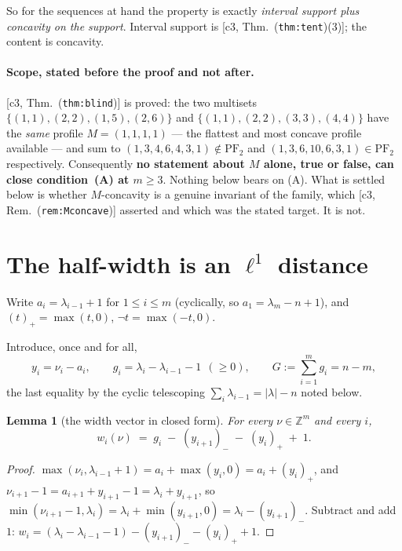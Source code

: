 \documentclass[11pt]{article}
\newtheorem{lemma}[theorem]{Lemma}
\theoremstyle{definition}
\newcommand{\Z}{\mathbb Z}
\newcommand{\PFtwo}{\mathrm{PF}_2}
\newcommand{\abs}[1]{\lvert #1\rvert}
\newcommand{\pos}[1]{(#1)_{+}}
\newcommand{\nneg}[1]{(#1)_{-}}
\begin{document}
So for the sequences at hand the property is exactly \emph{interval support plus
concavity on the support}. Interval support is [c3, Thm.~(\texttt{thm:tent})(3)]; the
content is concavity.

\paragraph{Scope, stated before the proof and not after.}
[c3, Thm.~(\texttt{thm:blind})] is proved: the two multisets
$\{(1,1),(2,2),(1,5),(2,6)\}$ and $\{(1,1),(2,2),(3,3),(4,4)\}$ have the \emph{same}
profile $M=(1,1,1,1)$ --- the flattest and most concave profile available --- and sum
to $(1,3,4,6,4,3,1)\notin\PFtwo$ and $(1,3,6,10,6,3,1)\in\PFtwo$ respectively.
Consequently \textbf{no statement about $M$ alone, true or false, can close
condition~(A) at $m\ge3$}. Nothing below bears on (A). What is settled below is whether
$M$-concavity is a genuine invariant of the family, which [c3,
Rem.~(\texttt{rem:Mconcave})] asserted and which was the stated target. It is not.

\section{The half-width is an $\ell^1$ distance}

Write $a_i=\lambda_{i-1}+1$ for $1\le i\le m$ (cyclically, so $a_1=\lambda_m-n+1$), and
$\pos t=\max(t,0)$, $\neg t=\max(-t,0)$.

Introduce, once and for all,
\begin{equation}\label{eq:y}
  y_i=\nu_i-a_i,\qquad g_i=\lambda_i-\lambda_{i-1}-1\ \ (\ge0),\qquad G:=\sum_{i=1}^mg_i=n-m,
\end{equation}
the last equality by the cyclic telescoping $\sum_i\lambda_{i-1}=\abs\lambda-n$ noted below.

\begin{lemma}[the width vector in closed form]\label{lem:w}
For every $\nu\in\Z^m$ and every $i$,
\begin{equation}\label{eq:w}
  w_i(\nu)\;=\;g_i\;-\;\nneg{y_{i+1}}\;-\;\pos{y_i}\;+\;1 .
\end{equation}
\end{lemma}

\begin{proof}
$\max(\nu_i,\lambda_{i-1}+1)=a_i+\max(y_i,0)=a_i+\pos{y_i}$, and
$\nu_{i+1}-1=a_{i+1}+y_{i+1}-1=\lambda_i+y_{i+1}$, so
$\min(\nu_{i+1}-1,\lambda_i)=\lambda_i+\min(y_{i+1},0)=\lambda_i-\nneg{y_{i+1}}$. Subtract and add
$1$: $w_i=(\lambda_i-\lambda_{i-1}-1)-\nneg{y_{i+1}}-\pos{y_i}+1$.
\end{proof}
\end{document}
